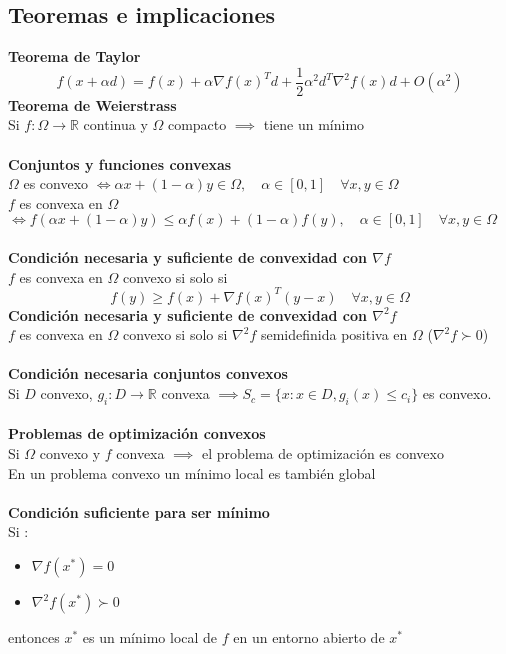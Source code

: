 \documentclass[leqno]{article}
\newcommand{\R}{\mathbb{R}}
\renewcommand{\O}{\Omega}
\newcommand{\N}{\nabla}
\begin{document}
\subsection{Teoremas e implicaciones}
\textbf{Teorema de Taylor} 
$$
f(x + \alpha d) = f(x) + \alpha \nabla f(x)^Td + \frac{1}{2} \alpha^2d^T\nabla^2f(x)d + O(\alpha^2)
$$
\textbf{Teorema de Weierstrass} \\
Si $f: \Omega \to \mathbb{R} $ continua y $\Omega$ compacto $\implies$ tiene un mínimo \\
\\
\textbf{Conjuntos y funciones convexas} \\
$\Omega$ es convexo $\iff \alpha x + (1-\alpha) y \in \Omega, \quad \alpha\in [0, 1] \quad \forall x, y \in \Omega $ \\
$f$ es convexa en $\Omega$ $\iff f(\alpha x + (1-\alpha) y) \leq \alpha f(x) + (1-\alpha)f(y), \quad \alpha\in [0, 1] \quad \forall x, y \in \Omega $ \\
\\
\textbf{Condición necesaria y suficiente de convexidad con $\N f$}\\
$f$ es convexa en $\Omega$ convexo si solo si
$$
f(y)\geq f(x) + \N f(x)^T(y-x) \quad \forall x, y \in \O
$$
\textbf{Condición necesaria y suficiente de convexidad con $\N^2 f$}\\
$f$ es convexa en $\Omega$ convexo si solo si $\N^2f$ semidefinida positiva en $\Omega$ ($\N^2f \succ 0$) \\
\\
\textbf{Condición necesaria conjuntos convexos}\\
Si $D$ convexo, $g_i: D\to \R$ convexa $\implies S_c = \{x:x\in D, g_i(x)\leq c_i\}$ es convexo. \\
\\
\textbf{Problemas de optimización convexos} \\
Si $\Omega$ convexo y $f$ convexa $\implies$ el problema de optimización es convexo \\
En un problema convexo un mínimo local es también global \\
\\
\textbf{Condición suficiente para ser mínimo} \\
Si :
\begin{itemize}
    \item $\N f(x^*) = 0$
    \item $\N^2 f(x^*) \succ 0$
\end{itemize}
entonces $x^*$ es un mínimo local de $f$ en un entorno abierto de $x^*$
\end{document}
